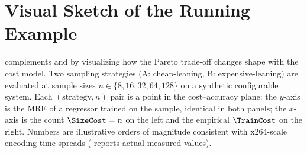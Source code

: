 \section{Visual Sketch of the Running Example}
\label{app:running-example-figure}

 complements  and
 by visualizing how the Pareto
trade-off changes shape with the cost model. Two sampling strategies
(A: cheap-leaning, B: expensive-leaning) are evaluated at sample sizes
$n\in\{8,16,32,64,128\}$ on a synthetic configurable system. Each
$(\text{strategy}, n)$ pair is a point in the cost--accuracy plane: the
$y$-axis is the MRE of a regressor trained on the sample, identical in
both panels; the $x$-axis is the count $\SizeCost=n$ on the left and
the empirical $\TrainCost$ on the right. Numbers are illustrative orders
of magnitude consistent with x264-scale encoding-time spreads
( reports actual measured values).

